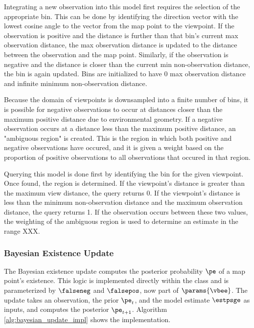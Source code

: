 Integrating a new observation into this model first requires the selection of the appropriate bin. This can be done by identifying the direction vector with the lowest cosine angle to the vector from the map point to the viewpoint. If the observation is positive and the distance is further than that bin's current max observation distance, the max observation distance is updated to the distance between the observation and the map point. Similarly, if the observation is negative and the distance is closer than the current min non-observation distance, the bin is again updated. Bins are initialized to have 0 max observation distance and infinite minimum non-observation distance.

Because the domain of viewpoints is downsampled into a finite number of bins, it is possible for negative observations to occur at distances closer than the maximum positive distance due to environmental geometry. If a negative observation occurs at a distance less than the maximum positive distance, an "ambiguous region" is created. This is the region in which both positive and negative observations have occured, and it is given a weight based on the proportion of positive observations to all observations that occured in that region.

Querying this model is done first by identifying the bin for the given viewpoint. Once found, the region is determined. If the viewpoint's distance is greater than the maximum view distance, the query returns 0. If the viewpoint's distance is less than the minimum non-observation distance and the maximum observation distance, the query returns 1. If the observation occurs between these two values, the weighting of the ambiguous region is used to determine an estimate in the range XXX.

\subsubsection{Bayesian Existence Update}
\label{sec:existence_confidence}

The Bayesian existence update computes the posterior probability $\pe$ of a map point’s existence. This logic is implemented directly within the \vbee{} class and is parameterized by $\falseneg$ and $\falsepos$, now part of $\params{\vbee}$. The update takes an observation, the prior $\pe_t$, and the model estimate $\estpsge$ as inputs, and computes the posterior $\pe_{t+1}$. Algorithm \ref{alg:bayesian_update_impl} shows the implementation.


